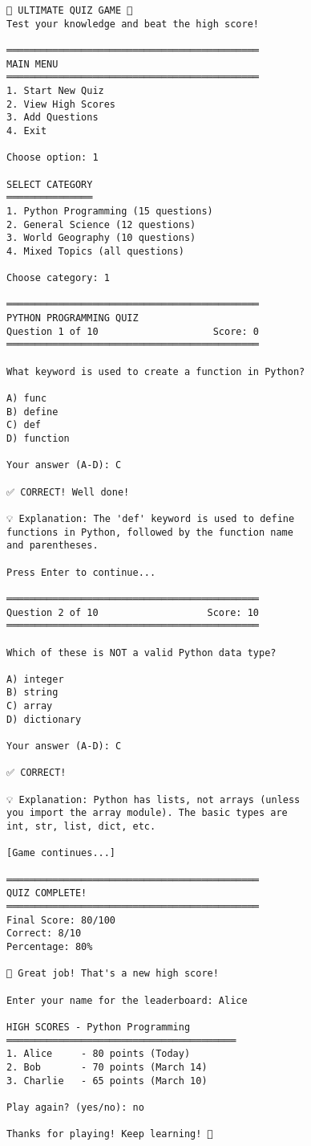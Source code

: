 \documentclass[
  letterpaper,
  DIV=11,
  numbers=noendperiod,
  oneside]{scrreprt}
\begin{document}
\begin{verbatim}
🎯 ULTIMATE QUIZ GAME 🎯
Test your knowledge and beat the high score!

════════════════════════════════════════════
MAIN MENU
════════════════════════════════════════════
1. Start New Quiz
2. View High Scores
3. Add Questions
4. Exit

Choose option: 1

SELECT CATEGORY
═══════════════
1. Python Programming (15 questions)
2. General Science (12 questions)
3. World Geography (10 questions)
4. Mixed Topics (all questions)

Choose category: 1

════════════════════════════════════════════
PYTHON PROGRAMMING QUIZ
Question 1 of 10                    Score: 0
════════════════════════════════════════════

What keyword is used to create a function in Python?

A) func
B) define  
C) def
D) function

Your answer (A-D): C

✅ CORRECT! Well done!

💡 Explanation: The 'def' keyword is used to define 
functions in Python, followed by the function name 
and parentheses.

Press Enter to continue...

════════════════════════════════════════════
Question 2 of 10                   Score: 10
════════════════════════════════════════════

Which of these is NOT a valid Python data type?

A) integer
B) string
C) array
D) dictionary

Your answer (A-D): C

✅ CORRECT! 

💡 Explanation: Python has lists, not arrays (unless 
you import the array module). The basic types are 
int, str, list, dict, etc.

[Game continues...]

════════════════════════════════════════════
QUIZ COMPLETE!
════════════════════════════════════════════
Final Score: 80/100
Correct: 8/10
Percentage: 80%

🎉 Great job! That's a new high score!

Enter your name for the leaderboard: Alice

HIGH SCORES - Python Programming
════════════════════════════════════════
1. Alice     - 80 points (Today)
2. Bob       - 70 points (March 14)
3. Charlie   - 65 points (March 10)

Play again? (yes/no): no

Thanks for playing! Keep learning! 🌟
\end{verbatim}
\end{document}
